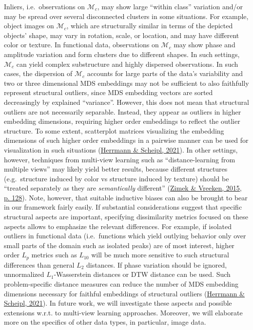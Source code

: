 \documentclass[
  10pt]{article}
\newcommand{\co}{c}
\newcommand{\Min}{\mathcal{M}_{\co}}
\begin{document}
Inliers, i.e.~observations on \(\Min\), may show large ``within class'' variation and/or may be spread over several disconnected clusters in some situations. For example, object images on \(\Min\), which are structurally similar in terms of the depicted objects' shape, may vary in rotation, scale, or location, and may have different color or texture. In functional data, observations on \(\Min\) may show phase and amplitude variation and form clusters due to different shapes. In such settings, \(\Min\) can yield complex substructure and highly dispersed observations. In such cases, the dispersion of \(\Min\) accounts for large parts of the data's variability and two or three dimensional MDS embeddings may not be sufficient to also faithfully represent structural outliers, since MDS embedding vectors are sorted decreasingly by explained ``variance''. However, this does not mean that structural outliers are not necessarily separable. Instead, they appear as outliers in higher embedding dimensions, requiring higher order embeddings to reflect the outlier structure. To some extent, scatterplot matrices visualizing the embedding dimensions of such higher order embeddings in a pairwise manner can be used for visualization in such situations (\protect\hyperlink{ref-herrmann2021geometric}{Herrmann \& Scheipl, 2021}). In other settings, however, techniques from multi-view learning such as ``distance-learning from multiple views'' may likely yield better results, because different structures (e.g.~structure induced by color vs structure induced by texture) should be ``treated separately as they are \emph{semantically} different'' (\protect\hyperlink{ref-zimek2015blind}{Zimek \& Vreeken, 2015, p. 128}). Note, however, that suitable inductive biases can also be brought to bear in our framework fairly easily. If substantial considerations suggest that specific structural aspects are important, specifying dissimilarity metrics focused on these aspects allows to emphasize the relevant differences. For example, if isolated outliers in functional data (i.e.~functions which yield outlying behavior only over small parts of the domain such as isolated peaks) are of most interest, higher order \(L_p\) metrics such as \(L_{10}\) will be much more sensitive to such structural differences than general \(L_2\) distances. If phase variation should be ignored, unnormalized \(L_1\)-Wasserstein distances or DTW distance can be used. Such problem-specific distance measures can reduce the number of MDS embedding dimensions necessary for faithful embeddings of structural outliers (\protect\hyperlink{ref-herrmann2021geometric}{Herrmann \& Scheipl, 2021}). In future work, we will investigate these aspects and possible extensions w.r.t. to multi-view learning approaches. Moreover, we will elaborate more on the specifics of other data types, in particular, image data.
\end{document}
